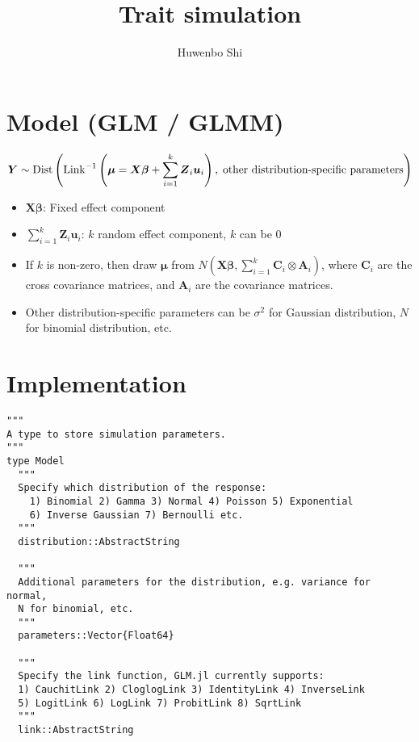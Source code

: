 \documentclass[12pt]{article}
\newcommand{\bu}{\boldsymbol{u}}
\newcommand{\bA}{\boldsymbol{A}}
\newcommand{\bC}{\boldsymbol{C}}
\newcommand{\bX}{\boldsymbol{X}}
\newcommand{\bY}{\boldsymbol{Y}}
\newcommand{\bZ}{\boldsymbol{Z}}
\newcommand{\bbeta}{\boldsymbol{\beta}}
\newcommand{\bmu}{\boldsymbol{\mu}}
\begin{document}
\title{Trait simulation}
\author{Huwenbo Shi}
\maketitle

\begin{spacing}{1.0}

\section{Model (GLM / GLMM)}

\begin{equation*}
    \bY \sim \text{Dist} \left( \text{Link}^{-1} \left( \bmu = \bX{\bbeta} +
    \sum_{i=1}^k \bZ_{i} \bu_{i} \right), \text{\;other distribution-specific parameters} \right)
\end{equation*}

\begin{itemize}
    \item $\bX\bbeta$: Fixed effect component
    \item $\sum_{i=1}^k \bZ_{i} \bu_{i}$: $k$ random effect component, $k$ can be 0
    \item If $k$ is non-zero, then draw $\bmu$ from $N(\bX\bbeta, \sum_{i=1}^k \bC_i \otimes \bA_{i})$,
          where $\bC_i$ are the cross covariance matrices, and $\bA_{i}$ are the covariance matrices.
    \item Other distribution-specific parameters can be $\sigma^2$ for Gaussian distribution,
          $N$ for binomial distribution, etc.
\end{itemize}

\section{Implementation}

\begin{lstlisting}
"""
A type to store simulation parameters.
"""
type Model
  """
  Specify which distribution of the response:
    1) Binomial 2) Gamma 3) Normal 4) Poisson 5) Exponential
    6) Inverse Gaussian 7) Bernoulli etc.
  """
  distribution::AbstractString

  """
  Additional parameters for the distribution, e.g. variance for normal,
  N for binomial, etc.
  """
  parameters::Vector{Float64}

  """
  Specify the link function, GLM.jl currently supports:
  1) CauchitLink 2) CloglogLink 3) IdentityLink 4) InverseLink
  5) LogitLink 6) LogLink 7) ProbitLink 8) SqrtLink
  """
  link::AbstractString


\end{lstlisting}
\end{spacing}
\end{document}
